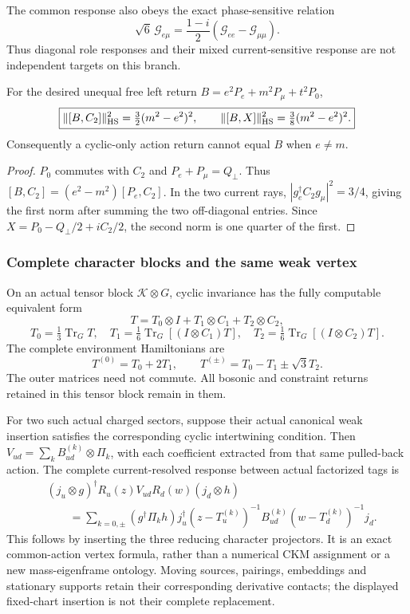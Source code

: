 \documentclass[12pt,a4paper]{article}
\begin{document}
The common response also obeys the exact phase-sensitive relation
\[
 \sqrt6\,\mathcal G_{e\mu}
   =\frac{1-i}{2}(\mathcal G_{ee}-\mathcal G_{\mu\mu}).
\]
Thus diagonal role responses and their mixed current-sensitive response
are not independent targets on this branch.

\begin{corollary}
\label{p4:v251:cor:required-noncyclic-content}
For the desired unequal free left return
$B=e^2P_e+m^2P_\mu+t^2P_0$,
\[
 \boxed{\|[B,C_2]\|_{\rm HS}^2=\tfrac32(m^2-e^2)^2,\qquad
        \|[B,X]\|_{\rm HS}^2=\tfrac38(m^2-e^2)^2.}
\]
Consequently a cyclic-only action return cannot equal $B$ when $e\ne m$.
\end{corollary}
\begin{proof}
$P_0$ commutes with $C_2$ and $P_e+P_\mu=Q_\perp$.
Thus $[B,C_2]=(e^2-m^2)[P_e,C_2]$. In the two current rays,
$|g_e^\dagger C_2g_\mu|^2=3/4$, giving the first norm after summing
the two off-diagonal entries. Since
$X=P_0-Q_\perp/2+iC_2/2$, the second norm is one quarter of the first.
\end{proof}

\subsubsection{Complete character blocks and the same weak vertex}
On an actual tensor block $\mathcal K\otimes G$, cyclic invariance has the
fully computable equivalent form
\[
 T=T_0\otimes I+T_1\otimes C_1+T_2\otimes C_2,
\]
\[
 T_0=\tfrac13\operatorname{Tr}_G T,\quad
 T_1=\tfrac16\operatorname{Tr}_G[(I\otimes C_1)T],\quad
 T_2=\tfrac16\operatorname{Tr}_G[(I\otimes C_2)T].
\]
The complete environment Hamiltonians are
\[
 T^{(0)}=T_0+2T_1,\qquad
 T^{(\pm)}=T_0-T_1\pm\sqrt3T_2.
\]
The outer matrices need not commute. All bosonic and constraint returns
retained in this tensor block remain in them.

For two such actual charged sectors, suppose their actual canonical weak
insertion satisfies the corresponding cyclic intertwining condition.
Then $V_{ud}=\sum_k B_{ud}^{(k)}\otimes\Pi_k$, with each coefficient
extracted from that same pulled-back action. The complete current-resolved
response between actual factorized tags is
\[
 \begin{aligned}
 &(j_u\otimes g)^\dagger R_u(z)V_{ud}R_d(w)(j_d\otimes h)\\
 &\qquad=\sum_{k=0,\pm}(g^\dagger\Pi_kh)
 j_u^\dagger(z-T_u^{(k)})^{-1}B_{ud}^{(k)}
                  (w-T_d^{(k)})^{-1}j_d.
 \end{aligned}
\]
This follows by inserting the three reducing character projectors. It
is an exact common-action vertex formula, rather than a numerical CKM
assignment or a new mass-eigenframe ontology. Moving sources, pairings,
embeddings and stationary supports retain their corresponding derivative
contacts; the displayed fixed-chart insertion is not their complete
replacement.
\end{document}
